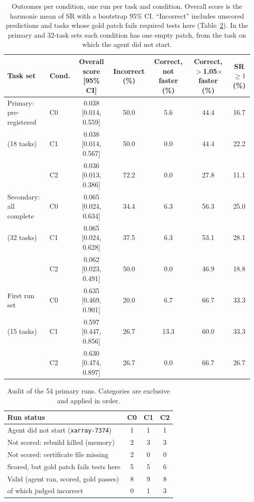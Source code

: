 \documentclass[conference]{IEEEtran}
\begin{document}
\begin{table}[t]
\caption{Outcomes per condition, one run per task and condition. Overall score
is the harmonic mean of SR with a bootstrap 95\% CI. ``Incorrect'' includes
unscored predictions and tasks whose gold patch fails required tests here
(Table~\ref{tab:validity}). In the primary and 32-task sets each condition
has one empty patch, from the task on which the agent did not start.}
\label{tab:main}
\centering
\footnotesize
\begin{tabular}{@{}llccccc@{}}
\toprule
Task set & Cond. & Overall score [95\% CI] & Incorrect (\%) & Correct, not faster (\%) & Correct, $>$1.05$\times$ faster (\%) & SR $\ge 1$ (\%) \\
\midrule
Primary: pre-registered & C0 & 0.038 [0.014, 0.559] & 50.0 & 5.6 & 44.4 & 16.7 \\
(18 tasks)              & C1 & 0.038 [0.014, 0.567] & 50.0 & 0.0 & 44.4 & 22.2 \\
                        & C2 & 0.036 [0.013, 0.386] & 72.2 & 0.0 & 27.8 & 11.1 \\
\midrule
Secondary: all complete & C0 & 0.065 [0.024, 0.634] & 34.4 & 6.3 & 56.3 & 25.0 \\
(32 tasks)              & C1 & 0.065 [0.024, 0.628] & 37.5 & 6.3 & 53.1 & 28.1 \\
                        & C2 & 0.062 [0.023, 0.491] & 50.0 & 0.0 & 46.9 & 18.8 \\
\midrule
First run set           & C0 & 0.635 [0.469, 0.901] & 20.0 & 6.7 & 66.7 & 33.3 \\
(15 tasks)              & C1 & 0.597 [0.447, 0.856] & 26.7 & 13.3 & 60.0 & 33.3 \\
                        & C2 & 0.630 [0.474, 0.897] & 26.7 & 0.0 & 66.7 & 26.7 \\
\bottomrule
\end{tabular}
\end{table}

\begin{table}[t]
\caption{Audit of the 54 primary runs. Categories are exclusive and applied
in order.}
\label{tab:validity}
\centering
\footnotesize
\setlength{\tabcolsep}{3pt}
\begin{tabular}{@{}lccc@{}}
\toprule
Run status & C0 & C1 & C2 \\
\midrule
Agent did not start (\texttt{xarray-7374}) & 1 & 1 & 1 \\
Not scored: rebuild killed (memory) & 2 & 3 & 3 \\
Not scored: certificate file missing & 2 & 0 & 0 \\
Scored, but gold patch fails tests here & 5 & 5 & 6 \\
Valid (agent ran, scored, gold passes) & 8 & 9 & 8 \\
\quad of which judged incorrect & 0 & 1 & 3 \\
\bottomrule
\end{tabular}
\end{table}
\end{document}
